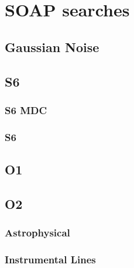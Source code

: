 \chapter{SOAP searches}

\section{Gaussian Noise}

\section{S6}

\subsection{S6 MDC}

\subsection{S6}

\section{O1}

\section{O2}

\subsection{Astrophysical}

\subsection{Instrumental Lines}

